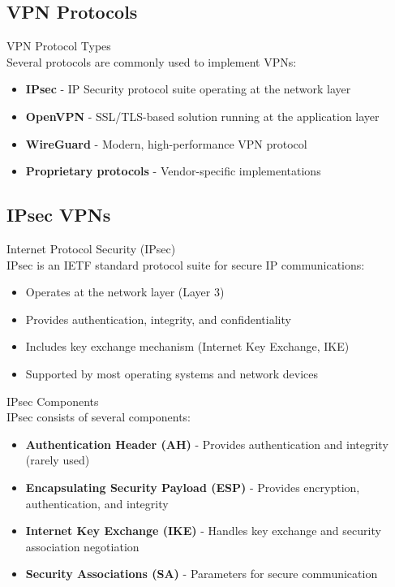 \subsection{VPN Protocols}

\begin{definition}{VPN Protocol Types}\\
Several protocols are commonly used to implement VPNs:
\begin{itemize}
    \item \textbf{IPsec} - IP Security protocol suite operating at the network layer
    \item \textbf{OpenVPN} - SSL/TLS-based solution running at the application layer
    \item \textbf{WireGuard} - Modern, high-performance VPN protocol
    \item \textbf{Proprietary protocols} - Vendor-specific implementations
\end{itemize}
\end{definition}

\subsection{IPsec VPNs}

\begin{definition}{Internet Protocol Security (IPsec)}\\
IPsec is an IETF standard protocol suite for secure IP communications:
\begin{itemize}
    \item Operates at the network layer (Layer 3)
    \item Provides authentication, integrity, and confidentiality
    \item Includes key exchange mechanism (Internet Key Exchange, IKE)
    \item Supported by most operating systems and network devices
\end{itemize}
\end{definition}

\begin{concept}{IPsec Components}\\
IPsec consists of several components:
\begin{itemize}
    \item \textbf{Authentication Header (AH)} - Provides authentication and integrity (rarely used)
    \item \textbf{Encapsulating Security Payload (ESP)} - Provides encryption, authentication, and integrity
    \item \textbf{Internet Key Exchange (IKE)} - Handles key exchange and security association negotiation
    \item \textbf{Security Associations (SA)} - Parameters for secure communication
\end{itemize}
\end{concept}

